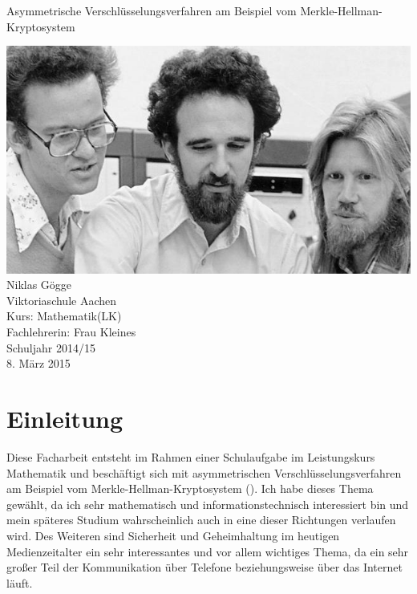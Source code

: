 \documentclass[a4paper,12pt,titlepage]{article}
\author
{
Niklas Gögge\\
Viktoriaschule Aachen\\
Kurs: Mathematik(LK)\\
Fachlehrerin: Frau Kleines\\
Schuljahr 2014/15
}
\begin{document}
\begin{titlepage}
\begin{center}

\LARGE Asymmetrische Verschlüsselungsverfahren am Beispiel vom Merkle-Hellman-Kryptosystem                






\vspace{2cm}
\includegraphics[scale=0.4,natwidth=640,natheight=360]{titlepicture.jpg} \\
\vspace{2cm}
\large
Niklas Gögge\\
Viktoriaschule Aachen\\
Kurs: Mathematik(LK)\\
Fachlehrerin: Frau Kleines\\
Schuljahr 2014/15 \\
\vspace{1cm}
8. März 2015
\end{center}
\end{titlepage}
\newpage
\tableofcontents
\newpage

\section{Einleitung}
Diese Facharbeit entsteht im Rahmen einer Schulaufgabe im Leistungskurs Mathematik und
beschäftigt sich mit asymmetrischen Verschlüsselungsverfahren am Beispiel vom
Merkle-Hellman-Kryptosystem (\cite{merklehellman_neer}). Ich habe dieses Thema gewählt, da ich sehr mathematisch und informationstechnisch interessiert bin und mein späteres
Studium wahrscheinlich auch in eine dieser Richtungen verlaufen wird. Des
Weiteren sind Sicherheit und Geheimhaltung im heutigen Medienzeitalter ein sehr
interessantes und vor allem wichtiges Thema, da ein sehr großer Teil der
Kommunikation über Telefone beziehungsweise über das Internet läuft.
\end{document}
